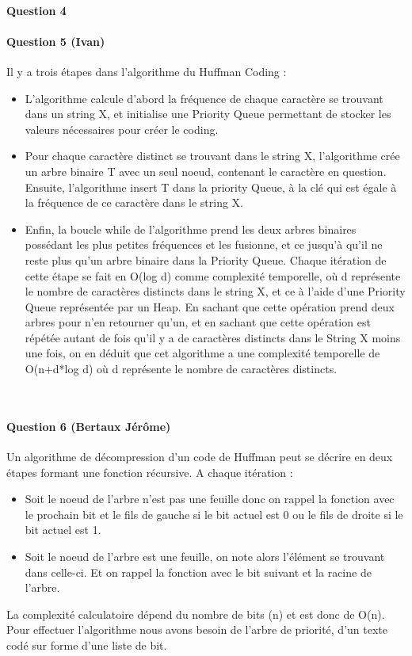 \documentclass[a4paper]{article}
\begin{document}
\paragraph*{Question 4}
\paragraph*{Question 5 (Ivan)}
Il y a trois étapes dans l’algorithme du Huffman Coding : 
\begin{itemize}


\item L’algorithme calcule d’abord la fréquence de chaque caractère se trouvant dans un string X, et initialise une Priority Queue permettant de stocker les valeurs nécessaires pour créer le coding. 
\item Pour chaque caractère distinct se trouvant dans le string X, l’algorithme crée un arbre binaire T avec un seul noeud, contenant le caractère en question. Ensuite, l’algorithme insert T dans la priority Queue, à la clé qui est égale à la fréquence de ce caractère dans le string X. 
\item Enfin, la boucle while de l’algorithme prend les deux arbres binaires possédant les plus petites fréquences et les fusionne, et ce jusqu’à qu’il ne reste plus qu’un arbre binaire dans la Priority Queue. Chaque itération de cette étape se fait en O(log d) comme complexité temporelle, où d représente le nombre de caractères distincts dans le string X, et ce à l’aide d’une Priority Queue représentée par un Heap. En sachant que cette opération prend deux arbres pour n’en retourner qu’un, et en sachant que cette opération est répétée autant de fois qu’il y a de caractères distincts dans le String X moins une fois, on en déduit que cet algorithme a une complexité temporelle de O(n+d*log d) où d représente le nombre de caractères distincts. 
\end{itemize}

\\
\paragraph*{Question 6 (Bertaux Jérôme)}
Un algorithme de décompression d'un code de Huffman peut se décrire en deux étapes formant une fonction récursive. A chaque itération :
\begin{itemize}
\item Soit le noeud de l'arbre n'est pas une feuille donc on rappel la fonction avec le prochain bit et le fils de gauche si le bit actuel est 0 ou le fils de droite si le bit actuel est 1.
\item Soit le noeud de l'arbre est une feuille, on note alors l'élément se trouvant dans celle-ci. Et on rappel la fonction avec le bit suivant et la racine de l'arbre.
\end{itemize} 
La complexité calculatoire dépend du nombre de bits (n) et est donc de O(n). Pour effectuer l'algorithme nous avons besoin de l'arbre de priorité, d'un texte codé sur forme d'une liste de bit.
\end{document}
